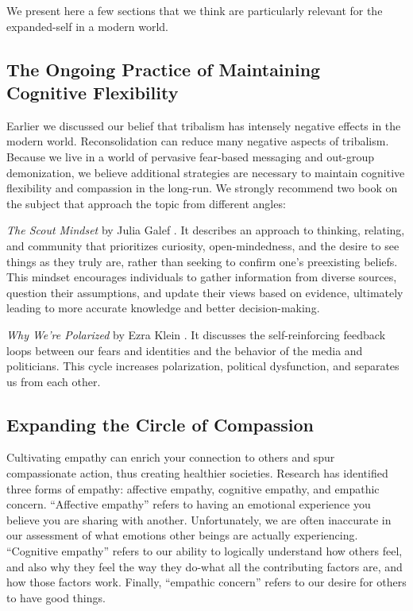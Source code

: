 \documentclass[12pt,letterpaper]{book}
\begin{document}
We present here a few sections that we think are particularly relevant for the expanded-self in a modern world.
\subsection{The Ongoing Practice of Maintaining Cognitive Flexibility}
Earlier we discussed our belief that tribalism has intensely negative effects in the modern world. Reconsolidation can reduce many negative aspects of tribalism. Because we live in a world of pervasive fear-based messaging and out-group demonization, we believe additional strategies are necessary to maintain cognitive flexibility and compassion in the long-run. We strongly recommend two book on the subject that approach the topic from different angles:

\textit{The Scout Mindset} by Julia Galef \cite{galefScoutMindset}. It describes an approach to thinking, relating, and community that prioritizes curiosity, open-mindedness, and the desire to see things as they truly are, rather than seeking to confirm one's preexisting beliefs. This mindset encourages individuals to gather information from diverse sources, question their assumptions, and update their views based on evidence, ultimately leading to more accurate knowledge and better decision-making.

\textit{Why We're Polarized} by Ezra Klein \cite{klein2020Polarized}. It discusses the self-reinforcing feedback loops between our fears and identities and the behavior of the media and politicians. This cycle increases polarization, political dysfunction, and separates us from each other.

\subsection{Expanding the Circle of Compassion}
\label{sec:circle}
Cultivating empathy can enrich your connection to others and spur compassionate action, thus creating healthier societies. Research has identified three forms of empathy: affective empathy, cognitive empathy, and empathic concern. “Affective empathy” refers to having an emotional experience you believe you are sharing with another. Unfortunately, we are often inaccurate in our assessment of what emotions other beings are actually experiencing. “Cognitive empathy” refers to our ability to logically understand how others feel, and also why they feel the way they do-what all the contributing factors are, and how those factors work. Finally, “empathic concern” refers to our desire for others to have good things.
\end{document}
